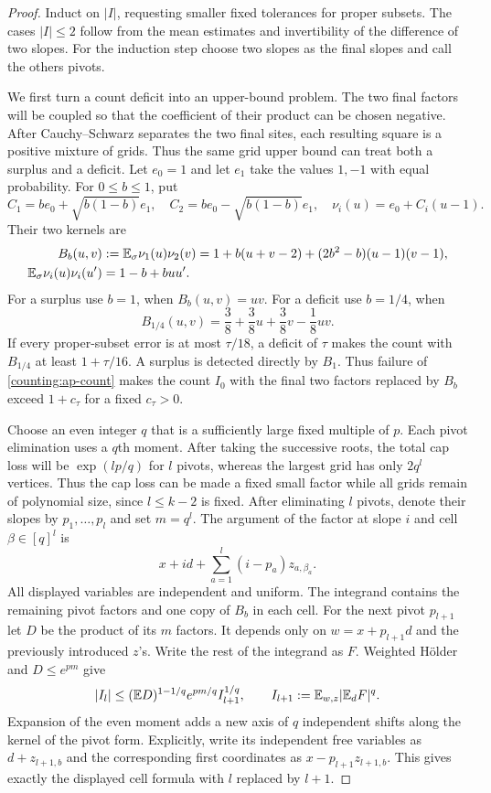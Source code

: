 \begin{proof}
Induct on $|I|$, requesting smaller fixed tolerances for proper subsets.
The cases $|I|\leq2$ follow from the mean estimates and invertibility of
the difference of two slopes.  For the induction step choose two slopes
as the final slopes and call the others pivots.

We first turn a count deficit into an upper-bound problem. The two
final factors will be coupled so that the coefficient of their product
can be chosen negative. After Cauchy--Schwarz separates the two final
sites, each resulting square is a positive mixture of grids. Thus the
same grid upper bound can treat both a surplus and a deficit. Let $e_0=1$
and let $e_1$ take the values $1,-1$ with equal probability.  For
$0\leq b\leq1$, put
\[
 C_1=be_0+\sqrt{b(1-b)}e_1,\quad
 C_2=be_0-\sqrt{b(1-b)}e_1,\quad
 \nu_i(u)=e_0+C_i(u-1).
\]
Their two kernels are
\begin{align}
 B_b(u,v)&:=\mathbb E_\sigma\nu_1(u)\nu_2(v)
 =1+b(u+v-2)+(2b^2-b)(u-1)(v-1),\label{counting:bilinear}\\
 \mathbb E_\sigma\nu_i(u)\nu_i(u')&=1-b+buu'.\label{counting:positive-kernel}
\end{align}
For a surplus use $b=1$, when $B_b(u,v)=uv$.  For a deficit use $b=1/4$,
when
\[
 B_{1/4}(u,v)=\frac38+\frac38u+\frac38v-\frac18uv.
\]
If every proper-subset error is at most $\tau/18$, a deficit of
$\tau$ makes the count with $B_{1/4}$ at least $1+\tau/16$.
A surplus is detected directly by $B_1$.  Thus failure of
\eqref{counting:ap-count} makes the count $I_0$ with the final two factors
replaced by $B_b$ exceed $1+c_\tau$ for a fixed $c_\tau>0$.

Choose an even integer $q$ that is a sufficiently large fixed multiple
of $p$. Each pivot elimination uses a $q$th moment. After taking the
successive roots, the total cap loss will be $\exp(lp/q)$ for $l$
pivots, whereas the largest grid has only $2q^l$ vertices. Thus the
cap loss can be made a fixed small factor while all grids remain of
polynomial size, since $l\le k-2$ is fixed.
After eliminating $l$ pivots, denote their slopes by
$p_1,\ldots,p_l$ and set $m=q^l$.  The argument of the factor at slope $i$
and cell $\beta\in[q]^l$ is
\[
 x+id+\sum_{a=1}^l(i-p_a)z_{a,\beta_a}.
\]
All displayed variables are independent and uniform.  The integrand
contains the remaining pivot factors and one copy of $B_b$ in each cell.
For the next pivot $p_{l+1}$ let $D$ be the product of its $m$ factors.
It depends only on $w=x+p_{l+1}d$ and the previously introduced $z$'s.
Write the rest of the integrand as $F$.  Weighted H\"older and
$D\leq e^{pm}$ give
\begin{equation}\label{counting:holder}
 |I_l|\leq(\mathbb E D)^{1-1/q}e^{pm/q}I_{l+1}^{1/q},
 \qquad
 I_{l+1}:=\mathbb E_{w,z}|\mathbb E_d F|^q.
\end{equation}
Expansion of the even moment adds a new axis of $q$ independent shifts
along the kernel of the pivot form.  Explicitly, write its independent
free variables as $d+z_{l+1,b}$ and the corresponding first coordinates
as $x-p_{l+1}z_{l+1,b}$.  This gives exactly the displayed cell formula
with $l$ replaced by $l+1$.


\end{proof}
